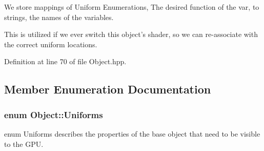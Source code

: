 We store mappings of Uniform Enumerations, The desired function of the var, to strings, the names of the variables. 

This is utilized if we ever switch this object's shader, so we can re-\/associate with the correct uniform locations. 

Definition at line 70 of file Object.\-hpp.



\subsection{Member Enumeration Documentation}
\hypertarget{class_object_a8c11d8700b0bb79a46c61f2de4f23fa3}{
\subsubsection[{Uniforms}]{\setlength{\rightskip}{0pt plus 5cm}enum {\bf Object\-::\-Uniforms}\hspace{0.3cm}{\ttfamily [inherited]}}}\label{class_object_a8c11d8700b0bb79a46c61f2de4f23fa3}


enum Uniforms describes the properties of the base object that need to be visible to the G\-P\-U. 

